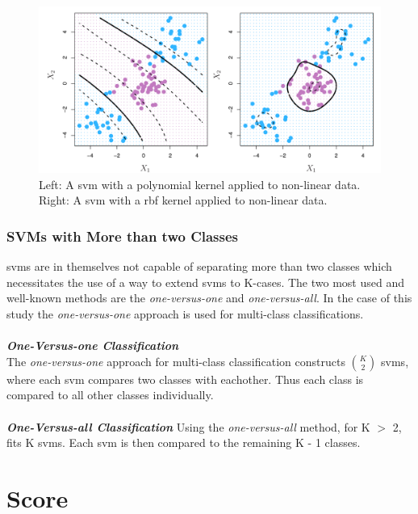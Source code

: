 \documentclass[11pt]{article}
\begin{document}
\begin{figure}[ht]
  \centering
  \includegraphics[width=12cm]{graphics/9_9.pdf}
  \caption{Left: A \gls{svm} with a polynomial kernel applied to non-linear data. Right: A \gls{svm} with a \gls{rbf} kernel applied to non-linear data.}
\end{figure}

\subsubsection{SVMs with More than two Classes}
\glspl{svm} are in themselves not capable of separating more than two classes which necessitates the use of a way to extend \glspl{svm} to K-cases. The two most used and well-known methods are the \textit{one-versus-one} and \textit{one-versus-all}. In the case of this study the \textit{one-versus-one} approach is used for multi-class classifications\cite{jamesSupportVectorMachines}.\\
\\
\textbf{\textit{One-Versus-one Classification}}\\
The \textit{one-versus-one} approach for multi-class classification constructs $\binom{K}{2}$ \glspl{svm}, where each \gls{svm} compares two classes with eachother. Thus each class is compared to all other classes individually.\cite{jamesSupportVectorMachines}\\
\\
\textbf{\textit{One-Versus-all Classification}}
Using the \textit{one-versus-all} method, for K $>$ 2, fits K \glspl{svm}. Each \gls{svm} is then compared to the remaining K - 1 classes.\cite{jamesSupportVectorMachines}
\section{Score}
\end{document}
